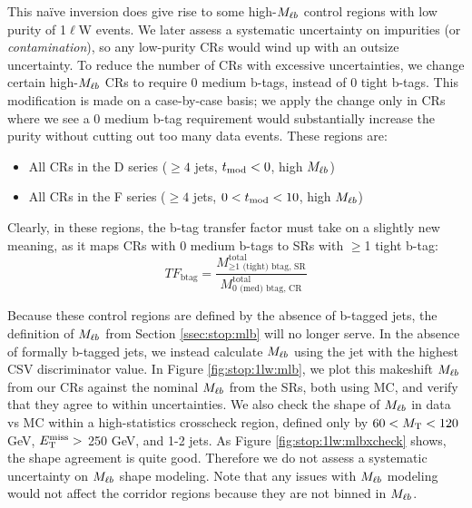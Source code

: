 This na\"{i}ve inversion does give rise to some high-$M_{\ell b}$ control regions with low
purity of 1$\ell$W events. We later assess a systematic uncertainty on
impurities (or \emph{contamination}), so any low-purity CRs would wind up
with an outsize uncertainty. To reduce the number of CRs with
excessive uncertainties, we change certain high-$M_{\ell b}$ CRs to
require 0 medium b-tags, instead of 0 tight b-tags. This modification
is made on a case-by-case basis; we apply the change only in CRs where
we see a 0 medium b-tag requirement would substantially increase the
purity without cutting out too many data events. These regions are:
\begin{itemize}
\item All CRs in the D series ($\geq 4$ jets, $t_\text{mod} < 0$, high $M_{\ell b}$)
\item All CRs in the F series ($\geq 4$ jets, $0 < t_\text{mod} < 10$, high $M_{\ell b}$)
\end{itemize}
Clearly, in these regions, the b-tag transfer factor must take
on a slightly new meaning, as it maps CRs with 0 medium b-tags to
SRs with $\geq$1 tight b-tag:
\begin{equation}
TF_\text{btag} = \frac{M_{\geq\text{1 (tight) btag,
      SR}}^\text{total}}{M_\text{0 (med) btag, CR}^\text{total}}
\end{equation}

Because these control regions are defined by the absence of
b-tagged jets, the definition of $M_{\ell b}$ from Section
\ref{ssec:stop:mlb} will no longer serve. In the absence of formally
b-tagged jets, we instead calculate $M_{\ell b}$ using the jet with
the highest CSV discriminator value.
In Figure \ref{fig:stop:1lw:mlb}, we plot this makeshift
$M_{\ell b}$ from our CRs against the nominal $M_{\ell b}$ from the
SRs, both using MC, and verify that they agree to within
uncertainties. We also check the shape of $M_{\ell b}$ in data vs MC
within a high-statistics crosscheck region, defined only by $60 < M_\text{T}
< 120$ GeV, $E_\text{T}^\text{miss} >$ 250 GeV, and 1-2 jets. As Figure
\ref{fig:stop:1lw:mlbxcheck} shows, the
shape agreement is quite good. Therefore we
do not assess a systematic uncertainty on $M_{\ell b}$ shape
modeling. Note that any issues with $M_{\ell b}$ modeling
would not affect the corridor regions because they are not binned in
$M_{\ell b}$.


